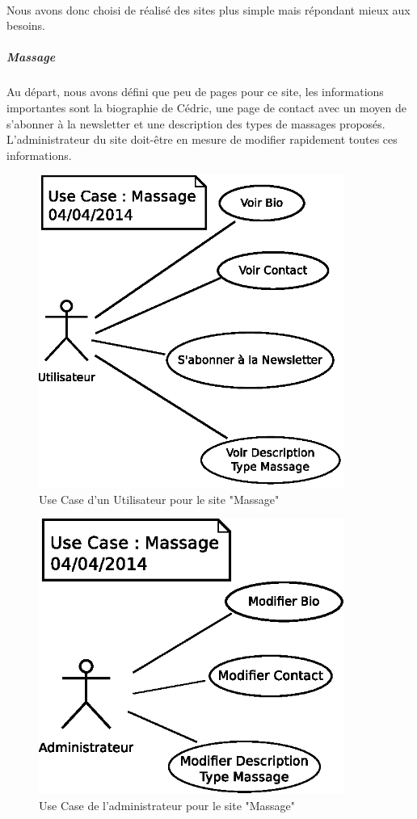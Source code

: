 \documentclass[11pt,a4paper]{report}
\begin{document}
				\paragraph*{}Nous avons donc choisi de réalisé des sites plus simple mais répondant mieux aux besoins.
					\subparagraph*{Massage}Au départ, nous avons défini que peu de pages pour ce site, les informations importantes sont la biographie de Cédric, une page de contact avec un moyen de s'abonner à la newsletter et une description des types de massages proposés. L'administrateur du site doit-être en mesure de modifier rapidement toutes ces informations.
						\begin{figure}[H]
							\centering
							\includegraphics[width=10cm]{UseCase-Massage-User.eps}
							\caption[Use Case Utilisateur Massage]{Use Case d'un Utilisateur pour le site "Massage"}
							\label{fig:UseCase-Massage User}
						\end{figure}
						\begin{figure}[H]
							\centering
							\includegraphics[width=10cm]{UseCase-Massage-Administrateur.eps}
							\caption[Use Case Administrateur Massage]{Use Case de l'administrateur pour le site "Massage"}
							\label{fig:UseCase-Massage Admin}
						\end{figure}
\end{document}
